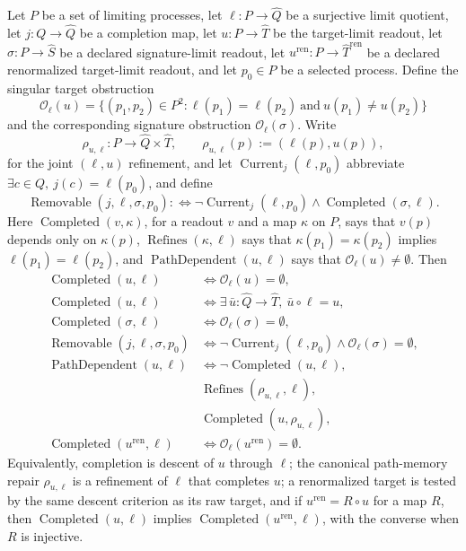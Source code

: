 \begin{theorem}\label{thm:F36}
Let \(P\) be a set of limiting processes, let \(\ell:P\to\widehat Q\)
be a surjective limit quotient, let \(j:Q\to\widehat Q\) be a
completion map, let \(u:P\to\widehat T\) be the target-limit readout,
let \(\sigma:P\to\widehat S\) be a declared signature-limit readout,
let \(u^{\mathrm{ren}}:P\to\widehat T^{\mathrm{ren}}\) be a declared
renormalized target-limit readout, and let \(p_0\in P\) be a selected
process.  Define the singular target obstruction
\[
  \mathcal O_{\ell}(u)
  =\{(p_1,p_2)\in P^2:
      \ell(p_1)=\ell(p_2)\ \text{and}\ u(p_1)\ne u(p_2)\}
\]
and the corresponding signature obstruction
\(\mathcal O_{\ell}(\sigma)\).  Write
\[
  \rho_{u,\ell}:P\to\widehat Q\times\widehat T,
  \qquad
  \rho_{u,\ell}(p):=(\ell(p),u(p)),
\]
for the joint \((\ell,u)\) refinement, and let
\(\operatorname{Current}_{j}(\ell,p_0)\) abbreviate
\(\exists c\in Q,\ j(c)=\ell(p_0)\), and define
\[
  \operatorname{Removable}(j,\ell,\sigma,p_0)
  :\Longleftrightarrow
  \neg\operatorname{Current}_{j}(\ell,p_0)
  \wedge
  \operatorname{Completed}(\sigma,\ell).
\]
Here \(\operatorname{Completed}(v,\kappa)\), for a readout \(v\) and a map
\(\kappa\) on \(P\), says that \(v(p)\) depends only on \(\kappa(p)\),
\(\operatorname{Refines}(\kappa,\ell)\) says that \(\kappa(p_1)=\kappa(p_2)\)
implies \(\ell(p_1)=\ell(p_2)\), and
\(\operatorname{PathDependent}(u,\ell)\) says that
\(\mathcal O_\ell(u)\ne\emptyset\).
Then
\begin{align*}
  \operatorname{Completed}(u,\ell)
  &\iff \mathcal O_{\ell}(u)=\emptyset,\\
  \operatorname{Completed}(u,\ell)
  &\iff
  \exists\,\bar u:\widehat Q\to\widehat T,\ \bar u\circ\ell=u,\\
  \operatorname{Completed}(\sigma,\ell)
  &\iff \mathcal O_{\ell}(\sigma)=\emptyset,\\
  \operatorname{Removable}(j,\ell,\sigma,p_0)
  &\iff \neg\operatorname{Current}_{j}(\ell,p_0)\wedge\mathcal O_{\ell}(\sigma)=\emptyset,\\
  \operatorname{PathDependent}(u,\ell)
  &\iff \neg\operatorname{Completed}(u,\ell),\\
  &\operatorname{Refines}(\rho_{u,\ell},\ell),\\
  &\operatorname{Completed}(u,\rho_{u,\ell}),\\
  \operatorname{Completed}(u^{\mathrm{ren}},\ell)
  &\iff
  \mathcal O_{\ell}(u^{\mathrm{ren}})=\emptyset.
\end{align*}
Equivalently, completion is descent of \(u\) through \(\ell\); the
canonical path-memory repair \(\rho_{u,\ell}\) is a refinement of
\(\ell\) that completes \(u\); a renormalized target is tested by the
same descent criterion as its raw target, and if \(u^{\mathrm{ren}}=R\circ u\) for a
map \(R\), then \(\operatorname{Completed}(u,\ell)\) implies
\(\operatorname{Completed}(u^{\mathrm{ren}},\ell)\), with the converse when \(R\) is
injective.
\end{theorem}
